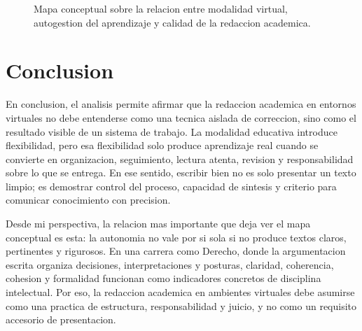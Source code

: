 \documentclass[
	spanish,
	letterpaper, oneside
]{article}
\begin{document}
\begin{landscape}
\begin{figure}[p]
{
}%
\caption{Mapa conceptual sobre la relacion entre modalidad virtual, autogestion del aprendizaje y calidad de la redaccion academica.}
\label{fig:mapa-conceptual-redaccion}
\end{figure}
\end{landscape}
\endgroup
\clearpage

\section{Conclusion}

En conclusion, el analisis permite afirmar que la redaccion academica en entornos virtuales no debe entenderse como una tecnica aislada de correccion, sino como el resultado visible de un sistema de trabajo. La modalidad educativa introduce flexibilidad, pero esa flexibilidad solo produce aprendizaje real cuando se convierte en organizacion, seguimiento, lectura atenta, revision y responsabilidad sobre lo que se entrega. En ese sentido, escribir bien no es solo presentar un texto limpio; es demostrar control del proceso, capacidad de sintesis y criterio para comunicar conocimiento con precision.

Desde mi perspectiva, la relacion mas importante que deja ver el mapa conceptual es esta: la autonomia no vale por si sola si no produce textos claros, pertinentes y rigurosos. En una carrera como Derecho, donde la argumentacion escrita organiza decisiones, interpretaciones y posturas, claridad, coherencia, cohesion y formalidad funcionan como indicadores concretos de disciplina intelectual. Por eso, la redaccion academica en ambientes virtuales debe asumirse como una practica de estructura, responsabilidad y juicio, y no como un requisito accesorio de presentacion.
\end{document}
